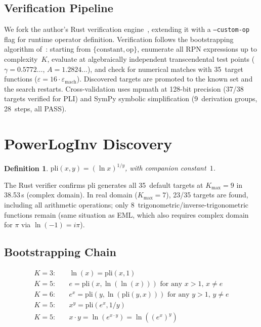 \documentclass[10pt,twocolumn]{article}
\newtheorem{definition}{Definition}
\theoremstyle{remark}
\begin{document}
\subsection{Verification Pipeline}

We fork the author's Rust verification engine~\cite{odrzywołek_code}, extending it with a \texttt{--custom-op} flag for runtime operator definition. Verification follows the bootstrapping algorithm of~\cite{odrzywołek2026}: starting from $\{\text{constant}, \mathrm{op}\}$, enumerate all RPN expressions up to complexity~$K$, evaluate at algebraically independent transcendental test points ($\gamma = 0.5772\ldots$, $A = 1.2824\ldots$), and check for numerical matches with 35~target functions ($\varepsilon = 16 \cdot \varepsilon_{\text{mach}}$). Discovered targets are promoted to the known set and the search restarts. Cross-validation uses mpmath at 128-bit precision (37/38 targets verified for PLI) and SymPy symbolic simplification (9~derivation groups, 28~steps, all PASS).

\section{PowerLogInv Discovery}

\begin{definition}
$\mathrm{pli}(x,y) = (\ln x)^{1/y}$, with companion constant~$1$.
\end{definition}

The Rust verifier confirms $\mathrm{pli}$ generates all 35~default targets at $K_{\max} = 9$ in 38.53\,s (complex domain). In real domain ($K_{\max} = 7$), 23/35 targets are found, including all arithmetic operations; only 8~trigonometric/inverse-trigonometric functions remain (same situation as EML, which also requires complex domain for $\pi$ via $\ln(-1) = i\pi$).

\subsection{Bootstrapping Chain}

\begin{align}
K{=}3:&\quad \ln(x) = \mathrm{pli}(x, 1) \label{eq:pli_ln}\\
K{=}5:&\quad e = \mathrm{pli}(x, \ln(\ln(x))) \text{ for any } x > 1,\, x \neq e \label{eq:pli_e}\\
K{=}6:&\quad e^x = \mathrm{pli}(y, \ln(\mathrm{pli}(y, x))) \text{ for any } y > 1,\, y \neq e \label{eq:pli_exp}\\
K{=}5:&\quad x^y = \mathrm{pli}(e^x, 1/y) \label{eq:pli_pow}\\
K{=}5:&\quad x \cdot y = \ln(e^{x \cdot y}) = \ln((e^x)^y) \label{eq:pli_times}
\end{align}
\end{document}
